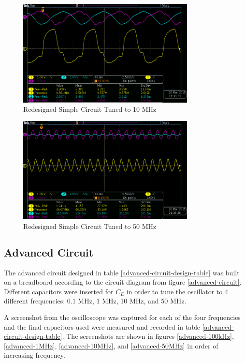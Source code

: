 \documentclass[titlepage, letterpaper, 10.5pt]{article}
\begin{document}
\begin{figure}[ht]
	\centering
	\includegraphics[width=0.8\textwidth]{results/simple-10MHz}
	\caption{Redesigned Simple Circuit Tuned to 10 MHz}
	\label{simple-10MHz}
\end{figure}

\begin{figure}[ht]
	\centering
	\includegraphics[width=0.8\textwidth]{results/simple-50MHz}
	\caption{Redesigned Simple Circuit Tuned to 50 MHz}
	\label{simple-50MHz}
\end{figure}

\subsection{Advanced Circuit}

The advanced circuit designed in table \ref{advanced-circuit-design-table}
was built on a breadboard according to the circuit diagram from figure
\ref{advanced-circuit}. Different capacitors were inserted for $C_{E}$
in order to tune the oscillator to 4 different frequencies: 0.1 MHz, 1 MHz, 10 MHz, and 50 MHz.

A screenshot from the oscilloscope was captured for each of the four frequencies and the final
capacitors used were measured and recorded in table
\ref{advanced-circuit-design-table}. The screenshots are shown in figures \ref{advanced-100kHz},
\ref{advanced-1MHz}, \ref{advanced-10MHz}, and \ref{advanced-50MHz} in order of increasing frequency.
\end{document}
